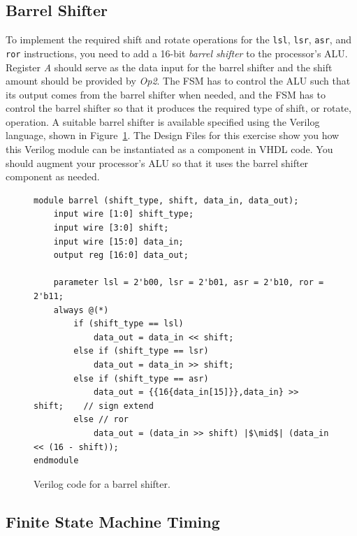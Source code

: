 \documentclass[epsfig,10pt,fullpage]{article} \addtolength{\textwidth}{1.5in}
\begin{document}
\subsection*{Barrel Shifter}

To implement the required shift and rotate operations for the \texttt{lsl}, \texttt{lsr},
\texttt{asr}, and \texttt{ror} instructions, you need to add a 16-bit {\it barrel shifter} to the
processor's ALU. Register {\it A} should serve as the data input for the barrel shifter and
the shift amount should be provided by {\it Op2}. The FSM has to control the ALU such that
its output comes from the barrel shifter when needed, and the FSM has to control the
barrel shifter so that it produces the required type of shift, or rotate, operation. A
suitable barrel shifter is available specified using the Verilog language, shown in 
Figure~\ref{fig:barrel}. The Design Files for this exercise show you how this Verilog
module can be instantiated as a component in VHDL code. You should augment your processor's
ALU so that it uses the barrel shifter component as needed. 

\lstset{language=Verilog,numbers=none,escapechar=|}
\begin{figure}[h]
\begin{center}
\begin{minipage}[h]{15 cm}
\begin{lstlisting}[]
module barrel (shift_type, shift, data_in, data_out);
    input wire [1:0] shift_type;
    input wire [3:0] shift;
    input wire [15:0] data_in;
    output reg [16:0] data_out;

    parameter lsl = 2'b00, lsr = 2'b01, asr = 2'b10, ror = 2'b11;
    always @(*)
        if (shift_type == lsl)
            data_out = data_in << shift;
        else if (shift_type == lsr) 
            data_out = data_in >> shift;
        else if (shift_type == asr) 
            data_out = {{16{data_in[15]}},data_in} >> shift;    // sign extend
        else // ror
            data_out = (data_in >> shift) |$\mid$| (data_in << (16 - shift));
endmodule
\end{lstlisting}
\end{minipage}
\caption{Verilog code for a barrel shifter.}
\label{fig:barrel}
\end{center}
\end{figure}

\subsection*{Finite State Machine Timing}
\end{document}
